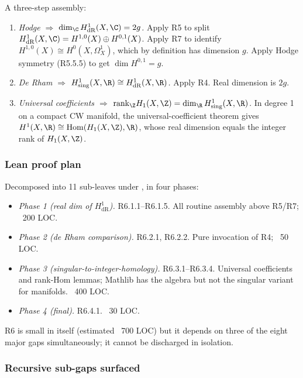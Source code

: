 A three-step assembly:

\begin{enumerate}
\item \emph{Hodge \(\Rightarrow\)
  \(\dim_{\C} H^1_{\mathrm{dR}}(X, \C) = 2g\).}  Apply R5 to split
  \(H^1_{\mathrm{dR}}(X, \C) = H^{1,0}(X) \oplus H^{0,1}(X)\).
  Apply R7 to identify \(H^{1,0}(X) \cong H^0(X, \Omega^1_X)\), which
  by definition has dimension \(g\).  Apply Hodge symmetry
  (R5.5.5) to get \(\dim H^{0,1} = g\).
\item \emph{De Rham \(\Rightarrow\)
  \(H^1_{\mathrm{sing}}(X, \R) \cong H^1_{\mathrm{dR}}(X, \R)\).}
  Apply R4.  Real dimension is \(2g\).
\item \emph{Universal coefficients \(\Rightarrow\)
  \(\mathrm{rank}_{\Z} H_1(X, \Z) = \dim_\R H^1_{\mathrm{sing}}(X, \R)\).}
  In degree 1 on a compact CW manifold, the universal-coefficient
  theorem gives \(H^1(X, \R) \cong \mathrm{Hom}(H_1(X, \Z), \R)\),
  whose real dimension equals the integer rank of \(H_1(X, \Z)\).
\end{enumerate}

\subsubsection*{Lean proof plan}

Decomposed into 11 sub-leaves under
, in four phases:

\begin{itemize}
\item \emph{Phase 1 (real dim of \(H^1_{\mathrm{dR}}\)).}
  R6.1.1--R6.1.5.  All routine assembly above R5/R7; ~200 LOC.
\item \emph{Phase 2 (de Rham comparison).}  R6.2.1, R6.2.2.  Pure
  invocation of R4; ~50 LOC.
\item \emph{Phase 3 (singular-to-integer-homology).}  R6.3.1--R6.3.4.
  Universal coefficients and rank-Hom lemmas; Mathlib has the algebra
  but not the singular variant for manifolds.  ~400 LOC.
\item \emph{Phase 4 (final).}  R6.4.1.  ~30 LOC.
\end{itemize}

R6 is small in itself (estimated ~700 LOC) but it depends on three of
the eight major gaps simultaneously; it cannot be discharged in
isolation.

\subsubsection*{Recursive sub-gaps surfaced}

